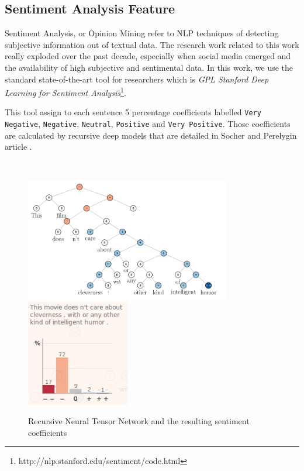 \subsection{Sentiment Analysis Feature}
Sentiment Analysis, or Opinion Mining refer to NLP techniques of detecting subjective information out of textual data. The research work related to this work really exploded over the past decade, especially when social media emerged and the availability of high subjective and sentimental data. In this work, we use the standard state-of-the-art tool for researchers which is \emph{GPL Stanford Deep Learning for Sentiment Analysis}\footnote{http://nlp.stanford.edu/sentiment/code.html}. 

This tool assign to each sentence 5 percentage coefficients labelled \texttt{Very Negative}, \texttt{Negative}, \texttt{Neutral}, \texttt{Positive} and \texttt{Very Positive}. Those coefficients are calculated by recursive deep models that are detailed in Socher and Perelygin article \cite{Socher_recursivedeep}.

\
\begin{figure}[H]
    \centering
    \includegraphics[width=0.8\textwidth]{fig/sentimenttree.png}
    \includegraphics[width=0.4\textwidth]{fig/sentimentcoeff.png}
    \caption[Short caption]{ Recursive Neural Tensor Network and the resulting sentiment coefficients}
    \label{fig:sentcoeff}
\end{figure}


